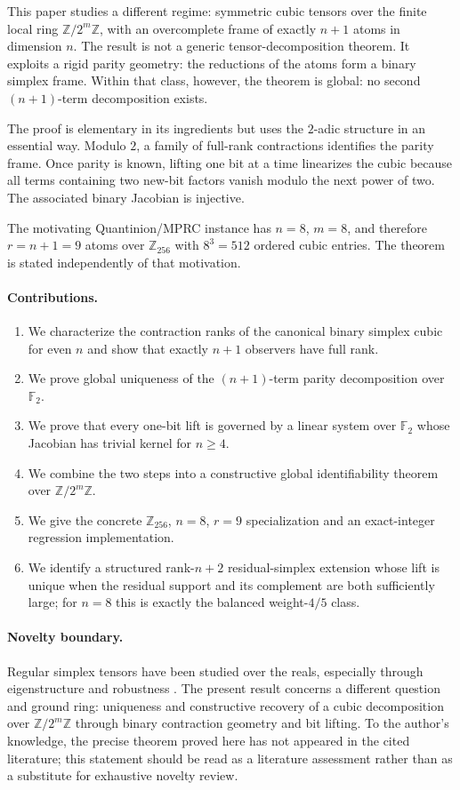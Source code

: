 \documentclass[11pt]{article}
\theoremstyle{definition}
\newcommand{\F}{\mathbb{F}}
\newcommand{\Z}{\mathbb{Z}}
\begin{document}
This paper studies a different regime: symmetric cubic tensors over the finite local ring $\Z/2^m\Z$, with an overcomplete frame of exactly $n+1$ atoms in dimension $n$. The result is not a generic tensor-decomposition theorem. It exploits a rigid parity geometry: the reductions of the atoms form a binary simplex frame. Within that class, however, the theorem is global: no second $(n+1)$-term decomposition exists.

The proof is elementary in its ingredients but uses the $2$-adic structure in an essential way. Modulo $2$, a family of full-rank contractions identifies the parity frame. Once parity is known, lifting one bit at a time linearizes the cubic because all terms containing two new-bit factors vanish modulo the next power of two. The associated binary Jacobian is injective.

The motivating Quantinion/MPRC instance has $n=8$, $m=8$, and therefore $r=n+1=9$ atoms over $\Z_{256}$ with $8^3=512$ ordered cubic entries. The theorem is stated independently of that motivation.

\paragraph{Contributions.}
\begin{enumerate}[leftmargin=*]
  \item We characterize the contraction ranks of the canonical binary simplex cubic for even $n$ and show that exactly $n+1$ observers have full rank.
  \item We prove global uniqueness of the $(n+1)$-term parity decomposition over $\F_2$.
  \item We prove that every one-bit lift is governed by a linear system over $\F_2$ whose Jacobian has trivial kernel for $n\ge 4$.
  \item We combine the two steps into a constructive global identifiability theorem over $\Z/2^m\Z$.
  \item We give the concrete $\Z_{256}$, $n=8$, $r=9$ specialization and an exact-integer regression implementation.
  \item We identify a structured rank-$n+2$ residual-simplex extension whose lift is unique when the residual support and its complement are both sufficiently large; for $n=8$ this is exactly the balanced weight-$4/5$ class.
\end{enumerate}

\paragraph{Novelty boundary.}
Regular simplex tensors have been studied over the reals, especially through eigenstructure and robustness \cite{CzaplinskiRaaschSteinberg2023,WangGengZhang2023}. The present result concerns a different question and ground ring: uniqueness and constructive recovery of a cubic decomposition over $\Z/2^m\Z$ through binary contraction geometry and bit lifting. To the author's knowledge, the precise theorem proved here has not appeared in the cited literature; this statement should be read as a literature assessment rather than as a substitute for exhaustive novelty review.
\end{document}
